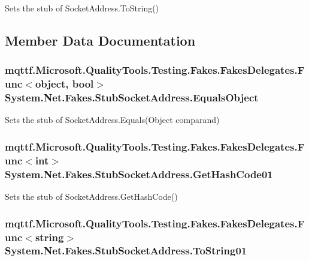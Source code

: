 Sets the stub of Socket\-Address.\-To\-String()



\subsection{Member Data Documentation}
\hypertarget{class_system_1_1_net_1_1_fakes_1_1_stub_socket_address_a49943c951dae6087c2e05b82db8c8cc4}{
\subsubsection[{Equals\-Object}]{\setlength{\rightskip}{0pt plus 5cm}mqttf.\-Microsoft.\-Quality\-Tools.\-Testing.\-Fakes.\-Fakes\-Delegates.\-Func$<$object, bool$>$ System.\-Net.\-Fakes.\-Stub\-Socket\-Address.\-Equals\-Object}}\label{class_system_1_1_net_1_1_fakes_1_1_stub_socket_address_a49943c951dae6087c2e05b82db8c8cc4}


Sets the stub of Socket\-Address.\-Equals(\-Object comparand)

\hypertarget{class_system_1_1_net_1_1_fakes_1_1_stub_socket_address_ab7241a4acf5bdf3ab4cc378dfa26aa59}{
\subsubsection[{Get\-Hash\-Code01}]{\setlength{\rightskip}{0pt plus 5cm}mqttf.\-Microsoft.\-Quality\-Tools.\-Testing.\-Fakes.\-Fakes\-Delegates.\-Func$<$int$>$ System.\-Net.\-Fakes.\-Stub\-Socket\-Address.\-Get\-Hash\-Code01}}\label{class_system_1_1_net_1_1_fakes_1_1_stub_socket_address_ab7241a4acf5bdf3ab4cc378dfa26aa59}


Sets the stub of Socket\-Address.\-Get\-Hash\-Code()

\hypertarget{class_system_1_1_net_1_1_fakes_1_1_stub_socket_address_a88b8e2b86bd82a9355020508de3c0c5c}{
\subsubsection[{To\-String01}]{\setlength{\rightskip}{0pt plus 5cm}mqttf.\-Microsoft.\-Quality\-Tools.\-Testing.\-Fakes.\-Fakes\-Delegates.\-Func$<$string$>$ System.\-Net.\-Fakes.\-Stub\-Socket\-Address.\-To\-String01}}\label{class_system_1_1_net_1_1_fakes_1_1_stub_socket_address_a88b8e2b86bd82a9355020508de3c0c5c}


